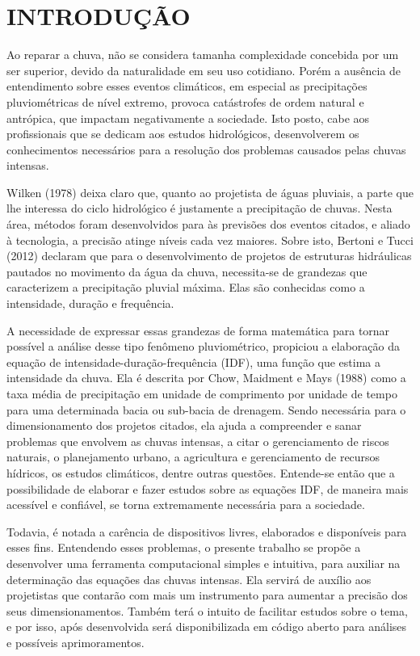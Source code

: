 \onehalfspacing
\chapter{INTRODUÇÃO}

Ao reparar a chuva, não se considera tamanha complexidade concebida por um ser superior, devido da naturalidade em seu uso cotidiano. Porém a ausência de entendimento sobre esses eventos climáticos, em especial as precipitações pluviométricas de nível extremo, provoca catástrofes de ordem natural e antrópica, que impactam negativamente a sociedade. Isto posto, cabe aos profissionais que se dedicam aos estudos hidrológicos, desenvolverem os conhecimentos necessários para a resolução dos problemas causados pelas chuvas intensas.

Wilken (1978) deixa claro que, quanto ao projetista de águas pluviais, a parte que lhe interessa do ciclo hidrológico é justamente a precipitação de chuvas. Nesta área, métodos foram desenvolvidos para às previsões dos eventos citados, e aliado à tecnologia, a precisão atinge níveis cada vez maiores. Sobre isto, Bertoni e Tucci (2012) declaram que para o desenvolvimento de projetos de estruturas hidráulicas pautados no movimento da água da chuva, necessita-se de grandezas que caracterizem a precipitação pluvial máxima. Elas são conhecidas como a intensidade, duração e frequência.

A necessidade de expressar essas grandezas de forma matemática para tornar possível a análise desse tipo fenômeno pluviométrico, propiciou a elaboração da equação de intensidade-duração-frequência (IDF), uma função que estima a intensidade da chuva. Ela é descrita por Chow, Maidment e Mays (1988) como a taxa média de precipitação em unidade de comprimento por unidade de tempo para uma determinada bacia ou sub-bacia de drenagem. Sendo necessária para o dimensionamento dos projetos citados, ela ajuda a compreender e sanar problemas que envolvem as chuvas intensas, a citar o gerenciamento de riscos naturais, o planejamento urbano, a agricultura e gerenciamento de recursos hídricos, os estudos climáticos, dentre outras questões. Entende-se então que a possibilidade de elaborar e fazer estudos sobre as equações IDF, de maneira mais acessível e confiável, se torna extremamente necessária para a sociedade. 

Todavia, é notada a carência de dispositivos livres, elaborados e disponíveis para esses fins. Entendendo esses problemas, o presente trabalho se propõe a desenvolver uma ferramenta computacional simples e intuitiva, para auxiliar na determinação das equações das chuvas intensas. Ela servirá de auxílio aos projetistas que contarão com mais um instrumento para aumentar a precisão dos seus dimensionamentos. Também terá o intuito de facilitar estudos sobre o tema, e por isso, após desenvolvida será disponibilizada em código aberto para análises e possíveis aprimoramentos.